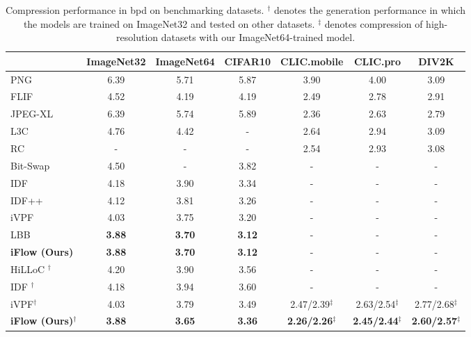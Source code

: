 \documentclass{article}
\begin{document}
\begin{table}[t]
\centering
\small
\caption{Compression performance in bpd on benchmarking datasets. $^\dag$ denotes the generation performance in which the models are trained on ImageNet32 and tested on other datasets. $^\ddag$ denotes compression of high-resolution datasets with our ImageNet64-trained model.}
\label{tab:small}
\begin{tabular}{lccc|ccc}
\toprule
         & ImageNet32 & ImageNet64 & CIFAR10 & CLIC.mobile & CLIC.pro &DIV2K \\
\midrule
PNG \cite{boutell1997png}     & 6.39        & 5.71        & 5.87 &3.90 & 4.00 & 3.09 \\
FLIF \cite{sneyers2016flif}    & 4.52        & 4.19        & 4.19&2.49 & 2.78 & 2.91 \\
JPEG-XL \cite{alakuijala2019jpeg} & 6.39 & 5.74 & 5.89 &2.36 & 2.63 & 2.79 \\
\midrule
L3C \cite{mentzer2019practical}      & 4.76        & 4.42           & - &2.64 & 2.94 & 3.09 \\
RC \cite{mentzer2020learning}  &-&-&-   & 2.54 & 2.93 & 3.08 \\
Bit-Swap \cite{kingma2019bit} & 4.50        & -           & 3.82 &-&-&-\\
\midrule
IDF \cite{hoogeboom2019integer}     & 4.18        & 3.90        & 3.34 &-&-&-\\
IDF++ \cite{berg2020idf++}   & 4.12        & 3.81        & 3.26 &-&-&-\\
iVPF \cite{zhang2021ivpf}     & 4.03        & 3.75     & 3.20 & - & - & - \\
LBB \cite{ho2019compression}      & \textbf{3.88}        & \textbf{3.70}        & \textbf{3.12} &-&-&-\\
\textbf{iFlow (Ours)}      & \textbf{3.88}  & \textbf{3.70} & \textbf{3.12}  & - & - & -\\
\midrule
HiLLoC \cite{townsend2019hilloc}$^\dag$  & 4.20        & 3.90        & 3.56 &-&-&-\\
IDF \cite{hoogeboom2019integer}$^\dag$     & 4.18        & 3.94        & 3.60 &-&-&-\\
iVPF$^\dag$ \cite{zhang2021ivpf}     & 4.03        & 3.79     & 3.49 & 2.47/2.39$^\ddag$ & 2.63/2.54$^\ddag$ & 2.77/2.68$^\ddag$ \\
\textbf{iFlow (Ours)}$^\dag$     & \textbf{3.88}  & \textbf{3.65}  & \textbf{3.36} &\textbf{2.26/2.26}$^\ddag$ & \textbf{2.45/2.44}$^\ddag$ & \textbf{2.60/2.57}$^\ddag$ \\
\bottomrule
\end{tabular}
\end{table}
\end{document}
